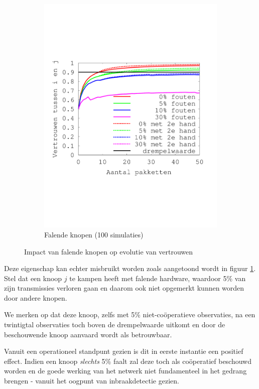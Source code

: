 \begin{figure}[ht]
\begin{subfigure}{.49\textwidth}
  \includegraphics[width=\linewidth]{./resources/reputation-with-failure.pdf}
  \caption{Falende knopen (100 simulaties)}
  \label{fig:reputation-with-failure}
\end{subfigure}
\caption{Impact van falende knopen op evolutie van vertrouwen}
\label{fig:reputation-paper-with-failure}
\end{figure}

Deze eigenschap kan echter misbruikt worden zoals aangetoond wordt in figuur
\ref{fig:reputation-with-failure}. Stel dat een knoop $j$ te kampen heeft met
falende hardware, waardoor 5\% van zijn transmissies verloren gaan en daarom
ook niet opgemerkt kunnen worden door andere knopen.

We merken op dat deze knoop, zelfs met 5\% niet-co\"operatieve observaties, na
een twintigtal observaties toch boven de drempelwaarde uitkomt en door de
beschouwende knoop aanvaard wordt als betrouwbaar.

Vanuit een operationeel standpunt gezien is dit in eerste instantie een
positief effect. Indien een knoop \emph{slechts} 5\% faalt zal deze toch als
co\"operatief beschouwd worden en de goede werking van het netwerk niet
fundamenteel in het gedrang brengen - vanuit het oogpunt van inbraakdetectie
gezien.

